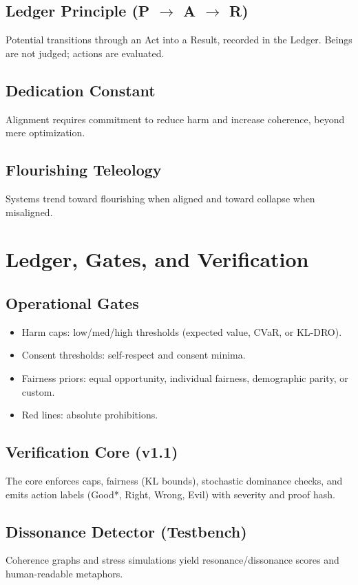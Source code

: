 \documentclass[11pt,oneside]{book}
\begin{document}
\section{Ledger Principle (P $\to$ A $\to$ R)}
Potential transitions through an Act into a Result, recorded in the Ledger. Beings are not judged; actions are evaluated.

\section{Dedication Constant}
Alignment requires commitment to reduce harm and increase coherence, beyond mere optimization.

\section{Flourishing Teleology}
Systems trend toward flourishing when aligned and toward collapse when misaligned.

\chapter{Ledger, Gates, and Verification}
\section{Operational Gates}
\begin{itemize}[leftmargin=1.5em]
  \item Harm caps: low/med/high thresholds (expected value, CVaR, or KL-DRO).
  \item Consent thresholds: self-respect and consent minima.
  \item Fairness priors: equal opportunity, individual fairness, demographic parity, or custom.
  \item Red lines: absolute prohibitions.
\end{itemize}

\section{Verification Core (v1.1)}
The core enforces caps, fairness (KL bounds), stochastic dominance checks, and emits action labels (Good*, Right, Wrong, Evil) with severity and proof hash.

\section{Dissonance Detector (Testbench)}
Coherence graphs and stress simulations yield resonance/dissonance scores and human-readable metaphors.
\end{document}
